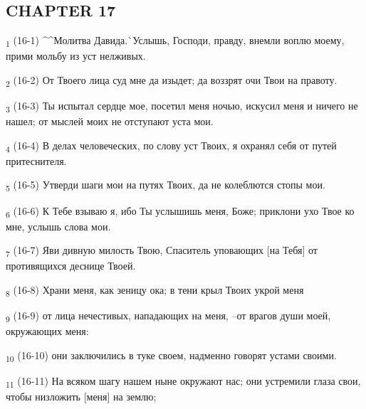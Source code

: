 \subsection{CHAPTER 17}
\begin{tcolorbox}
\textsubscript{1} (16-1) ^^Молитва Давида.^^ Услышь, Господи, правду, внемли воплю моему, прими мольбу из уст нелживых.
\end{tcolorbox}
\begin{tcolorbox}
\textsubscript{2} (16-2) От Твоего лица суд мне да изыдет; да воззрят очи Твои на правоту.
\end{tcolorbox}
\begin{tcolorbox}
\textsubscript{3} (16-3) Ты испытал сердце мое, посетил меня ночью, искусил меня и ничего не нашел; от мыслей моих не отступают уста мои.
\end{tcolorbox}
\begin{tcolorbox}
\textsubscript{4} (16-4) В делах человеческих, по слову уст Твоих, я охранял себя от путей притеснителя.
\end{tcolorbox}
\begin{tcolorbox}
\textsubscript{5} (16-5) Утверди шаги мои на путях Твоих, да не колеблются стопы мои.
\end{tcolorbox}
\begin{tcolorbox}
\textsubscript{6} (16-6) К Тебе взываю я, ибо Ты услышишь меня, Боже; приклони ухо Твое ко мне, услышь слова мои.
\end{tcolorbox}
\begin{tcolorbox}
\textsubscript{7} (16-7) Яви дивную милость Твою, Спаситель уповающих [на Тебя] от противящихся деснице Твоей.
\end{tcolorbox}
\begin{tcolorbox}
\textsubscript{8} (16-8) Храни меня, как зеницу ока; в тени крыл Твоих укрой меня
\end{tcolorbox}
\begin{tcolorbox}
\textsubscript{9} (16-9) от лица нечестивых, нападающих на меня, --от врагов души моей, окружающих меня:
\end{tcolorbox}
\begin{tcolorbox}
\textsubscript{10} (16-10) они заключились в туке своем, надменно говорят устами своими.
\end{tcolorbox}
\begin{tcolorbox}
\textsubscript{11} (16-11) На всяком шагу нашем ныне окружают нас; они устремили глаза свои, чтобы низложить [меня] на землю;
\end{tcolorbox}
